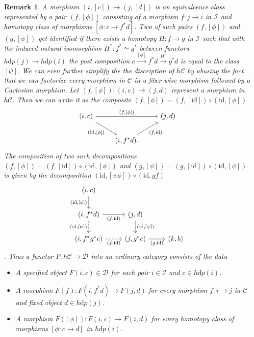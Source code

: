 \documentclass{article}
\newcommand{\xto}{\xrightarrow}
\newcommand{\cC}{\mathcal{C}}
\newcommand{\cD}{\mathcal{D}}
\newcommand{\id}{\mathrm{id}}
\newtheorem{remark}{Remark}
\begin{document}
\begin{remark}
  A morphism $(i, [c]) \to (j, [d])$ is an equivalcence class represented by a pair $(f, [\phi])$ consisting 
  of a morphism 
  $f \colon j \to i$ in $\mathcal I$ and homotopy class of morphisms $[\phi \colon c \to f^*d]$. 
  Two of such pairs $(f, [\phi])$ and $(g, [\psi])$ get identified if there exists 
  a homotopy $H \colon f \to g$ in $\mathcal I$ such that with the induced natural 
  isomorphism $H^* \colon f^* \simeq g^*$ between functors 
  $h {\mathrm{d}} p(j) \to h {\mathrm{d}} p(i)$
  the post composition $c \xto{[\phi]} f^*d \xto{H^*} g^*d$ is equal to the class 
  $[\psi]$.
  We can even further simplify the the discription of $h\cC$ by abusing the fact 
  that we can factorize every morphism in $\cC$ in a fiber wise morphism followed by a Cartesian 
  morphism. Let $(f,[\phi]) \colon (i,c) \to (j, d)$ represent a morphism in $h \cC$.
  Then we can write it as the composite $(f,[\phi]) = (f, [\id]) \circ (\id, [\phi])$
  \[\begin{tikzcd}
      {(i,c)} && {(j,d)} \\
      & {(i,f^*d)}
      \arrow["{(f,[\phi])}", from=1-1, to=1-3]
      \arrow["{(\id,[\phi])}"', from=1-1, to=2-2]
      \arrow["{(f,\id)}"', from=2-2, to=1-3].
  \end{tikzcd}\]
  The composition of two such decompositions $(f,[\phi]) = (f, [\id]) \circ (\id, [\phi])$ and 
  $(g,[\psi]) = (g, [\id]) \circ (\id, [\psi])$ is given by the decomposition $(\id, [\psi \phi])\circ (\id, gf)$
  \[\begin{tikzcd}
      {(i,c)} \\
      {(i,f^*d)} & {(j,d)} \\
      {(i,f^*g^*e)} & {(j, g^*e)} & {(k,b)}
      \arrow["{(\id,[\phi])}"', from=1-1, to=2-1]
      \arrow["{(f,\id)}"', from=2-1, to=2-2]
      \arrow["{(\id,[\psi])}", from=2-2, to=3-2]
      \arrow["{(g,\id)}"', from=3-2, to=3-3]
      \arrow["{(\id,[\psi])}"', dashed, from=2-1, to=3-1]
      \arrow["{(f,\id)}"', dashed, from=3-1, to=3-2]
  \end{tikzcd}\].
  Thus a functor $F \colon h\cC \to \cD$ into an ordinary category consists of the data 
  \begin{itemize}
    \item A specified object $F(i,c) \in \cD$ for each pair $i \in \mathcal I$ and $c \in  h {\mathrm{d}} p(i)$.
    \item A morphism $F(f) \colon F(i,f^*d) \to F(j,d)$ for every morphism $f \colon i \to j$ in $\cC$ and fixed object $d \in h {\mathrm{d}} p(j)$.
    \item A morphism $F([\phi]) \colon F(i, c) \to F(i, d)$ for every homotopy class of morphisms $[\phi \colon c \to d]$ in $ h {\mathrm{d}} p(i)$.

\end{itemize}
\end{remark}
\end{document}
